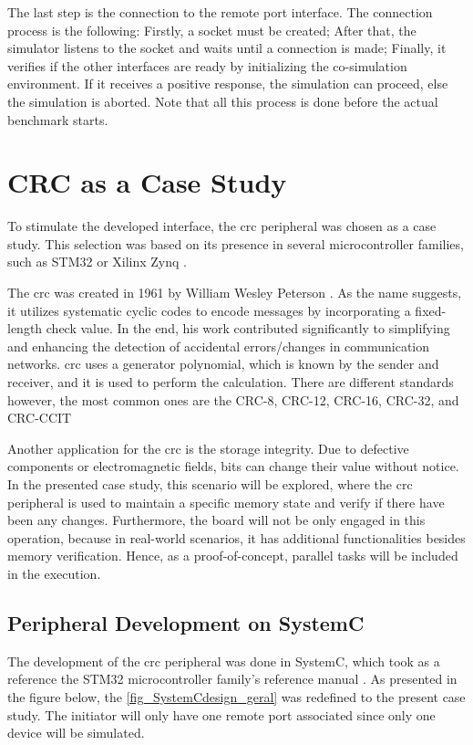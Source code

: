 The last step is the connection to the remote port interface. The connection process is the following: Firstly, a socket must be created; 
After that, the simulator listens to the socket and waits until a connection is made; Finally, it verifies if the other interfaces are ready 
by initializing the co-simulation environment. If it receives a positive response, the simulation can proceed, else the simulation is aborted. 
Note that all this process is done before the actual benchmark starts. 

\section{CRC as a Case Study}

To stimulate the developed interface, the \gls{crc} peripheral was chosen as a case study.
This selection was based on its presence in several microcontroller families, such as STM32 \cite{referenceManualRM0385} or Xilinx Zynq \cite{xilinx2014zynq}.

The \gls{crc} was created in 1961 by William Wesley Peterson \cite{peterson1961cyclic}. As the name suggests, 
it utilizes systematic cyclic codes to encode messages by incorporating a fixed-length check value. In the end, his work
contributed significantly to simplifying and enhancing the detection of accidental errors/changes in communication 
networks. \gls{crc} uses a generator polynomial, which is known by the sender and receiver, and it is used to 
perform the calculation. There are different standards however, the most common ones are the CRC-8, CRC-12, CRC-16, 
CRC-32, and CRC-CCIT \cite{borrelli2001ieee}

Another application for the \gls{crc} is the storage integrity. Due to defective components or electromagnetic fields,
bits can change their value without notice. In the presented case study, this scenario will be explored, where 
the \gls{crc} peripheral is used to maintain a specific memory state and verify if there have been any changes. 
Furthermore, the board will not be only engaged in this operation, because in real-world scenarios, it has additional functionalities 
besides memory verification. Hence, as a proof-of-concept, parallel tasks will be included in the execution.

\subsection{Peripheral Development on SystemC}

The development of the \gls{crc} peripheral was done in SystemC, which took as a reference the STM32 microcontroller family's 
reference manual \cite{referenceManualRM0385}. As presented in the figure below, the \autoref{fig_SystemCdesign_geral} was redefined to 
the present case study. The initiator will only have one remote port associated since only one device will be simulated.

